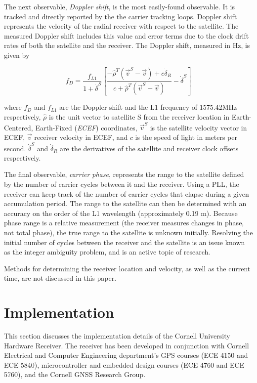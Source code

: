 \documentclass[12pt]{article}
\begin{document}
The next observable, \emph{Doppler shift}, is the most easily-found observable. It is tracked and directly reported by the the carrier tracking loops. Doppler shift represents the velocity of the radial receiver with respect to the satellite. The measured Doppler shift includes this value and error terms due to the clock drift rates of both the satellite and the receiver. The Doppler shift, measured in Hz, is given by

\begin{equation}
\label{eqn:doppler}
f_D=\frac{f_{L1}}{1+\dot{\delta}^S}\left[\frac{-\hat{\rho}^T(\vec{v}^S-\vec{v})+c\dot{\delta}_R}{c+\hat{\rho}^T(\vec{v}^S-\vec{v})} - \dot{\delta}^S\right]
\end{equation}

where $f_D$ and $f_{L1}$ are the Doppler shift and the L1 frequency of 1575.42MHz respectively, $\hat{\rho}$ is the unit vector to satellite S from the receiver location in Earth-Centered, Earth-Fixed (\emph{ECEF}) coordinates, $\vec{v}^S$ is the satellite velocity vector in ECEF, $\vec{v}$ receiver velocity in ECEF, and $c$ is the speed of light in meters per second. $\dot{\delta}^S$ and $\dot{\delta}_R$ are the derivatives of the satellite and receiver clock offsets respectively.

The final observable, \emph{carrier phase}, represents the range to the satellite defined by the number of carrier cycles between it and the receiver. Using a PLL, the receiver can keep track of the number of carrier cycles that elapse during a given accumulation period. The range to the satellite can then be determined with an accuracy on the order of the L1 wavelength (approximately 0.19 m). Because phase range is a relative measurement (the receiver measures changes in phase, not total phase), the true range to the satellite is unknown initially. Resolving the initial number of cycles between the receiver and the satellite is an issue known as the integer ambiguity problem, and is an active topic of research.

Methods for determining the receiver location and velocity, as well as the current time, are not discussed in this paper.

\section{Implementation}
This section discusses the implementation details of the Cornell University Hardware Receiver. The receiver has been developed in conjunction with Cornell Electrical and Computer Engineering department's GPS courses (ECE 4150 and ECE 5840), microcontroller and embedded design courses (ECE 4760 and ECE 5760), and the Cornell GNSS Research Group.
\end{document}

